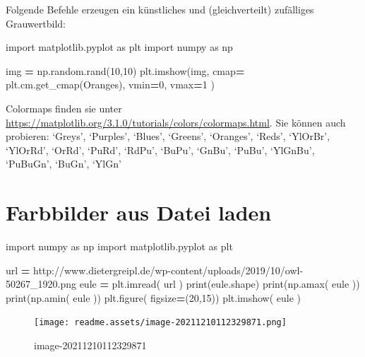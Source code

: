 \documentclass[
  oneside]{book}
\newenvironment{Shaded}{\begin{snugshade}}{\end{snugshade}}
\newcommand{\BuiltInTok}[1]{#1}
\newcommand{\DecValTok}[1]{\textcolor[rgb]{0.00,0.00,0.81}{#1}}
\newcommand{\ImportTok}[1]{#1}
\newcommand{\NormalTok}[1]{#1}
\newcommand{\OperatorTok}[1]{\textcolor[rgb]{0.81,0.36,0.00}{\textbf{#1}}}
\newcommand{\StringTok}[1]{\textcolor[rgb]{0.31,0.60,0.02}{#1}}
\begin{document}
Folgende Befehle erzeugen ein künstliches und (gleichverteilt) zufälliges Grauwertbild:

\begin{Shaded}
\begin{Highlighting}[]
\ImportTok{import}\NormalTok{ matplotlib.pyplot }\ImportTok{as}\NormalTok{ plt}
\ImportTok{import}\NormalTok{ numpy }\ImportTok{as}\NormalTok{ np}

\NormalTok{img }\OperatorTok{=}\NormalTok{ np.random.rand(}\DecValTok{10}\NormalTok{,}\DecValTok{10}\NormalTok{)}
\NormalTok{plt.imshow(img, cmap}\OperatorTok{=}\NormalTok{ plt.cm.get\_cmap(}\StringTok{\textquotesingle{}Oranges\textquotesingle{}}\NormalTok{), vmin}\OperatorTok{=}\DecValTok{0}\NormalTok{, vmax}\OperatorTok{=}\DecValTok{1}\NormalTok{  )}
\end{Highlighting}
\end{Shaded}

Colormaps finden sie unter \url{https://matplotlib.org/3.1.0/tutorials/colors/colormaps.html}. Sie können auch probieren: `Greys', `Purples', `Blues', `Greens', `Oranges', `Reds', `YlOrBr', `YlOrRd', `OrRd', `PuRd', `RdPu', `BuPu', `GnBu', `PuBu', `YlGnBu', `PuBuGn', `BuGn', `YlGn'

\hypertarget{farbbilder-aus-datei-laden}{%
\section{Farbbilder aus Datei laden}\label{farbbilder-aus-datei-laden}}

\begin{Shaded}
\begin{Highlighting}[]
\ImportTok{import}\NormalTok{ numpy }\ImportTok{as}\NormalTok{ np}
\ImportTok{import}\NormalTok{ matplotlib.pyplot }\ImportTok{as}\NormalTok{ plt}

\NormalTok{url }\OperatorTok{=} \StringTok{\textquotesingle{}http://www.dietergreipl.de/wp{-}content/uploads/2019/10/owl{-}50267\_1920.png\textquotesingle{}}
\NormalTok{eule }\OperatorTok{=}\NormalTok{ plt.imread( url )}
\BuiltInTok{print}\NormalTok{(eule.shape)}
\BuiltInTok{print}\NormalTok{(np.amax( eule ))}
\BuiltInTok{print}\NormalTok{(np.amin( eule ))}
\NormalTok{plt.figure( figsize}\OperatorTok{=}\NormalTok{(}\DecValTok{20}\NormalTok{,}\DecValTok{15}\NormalTok{))}
\NormalTok{plt.imshow( eule )}
\end{Highlighting}
\end{Shaded}

\begin{figure}
\centering
\texttt{[image: readme.assets/image-20211210112329871.png]}
\caption{image-20211210112329871}
\end{figure}
\end{document}
